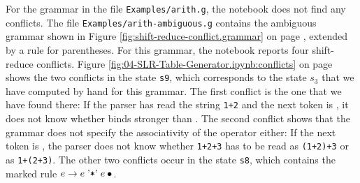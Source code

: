 For the grammar in the file \texttt{Examples/arith.g}, the notebook does not find any conflicts.  The file
\texttt{Examples/arith-ambiguous.g} contains the ambiguous grammar shown in Figure
\ref{fig:shift-reduce-conflict.grammar} on page \pageref{fig:shift-reduce-conflict.grammar}, extended by a rule for
parentheses.  For this grammar, the notebook reports four shift-reduce conflicts.  Figure
\ref{fig:04-SLR-Table-Generator.ipynb:conflicts} on page \pageref{fig:04-SLR-Table-Generator.ipynb:conflicts} shows the
two conflicts in the state \texttt{s9}, which corresponds to the state $s_3$ that we have computed by hand for this
grammar.  The first conflict is the one that we have found there:  If the parser has read the string
\texttt{1+2} and the next token is \saquoted{*}, it does not know whether \saquoted{*} binds stronger than
\saquoted{+}.  The second conflict shows that the grammar does not specify the associativity of the operator
\saquoted{+} either:  If the next token is \saquoted{+}, the parser does not know whether \texttt{1+2+3} has to be
read as \texttt{(1+2)+3} or as \texttt{1+(2+3)}.  The other two conflicts occur in the state \texttt{s8}, which
contains the marked rule $e \rightarrow e \;\saquoted{*}\; e \mdot$.

